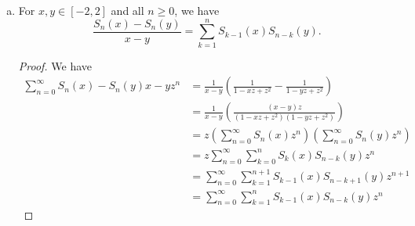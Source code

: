 \documentclass{article}
\begin{document}
\begin{enumerate}[(a)]
\begin{proof}
      Letting $x = 2 \cos(\theta)$, we have
      \begin{align*}
        \sum_{n=0}^\infty S_n(x) z^n & = \sum_{n=0}^\infty \frac{\sin((n+1) \theta)}{\sin{\theta}} z^n \\
        & =  \frac{1}{2i \sin(\theta)} \sum_{n=0}^\infty (e^{in\theta} - e^{-in\theta}) z^n \\
        & =  \frac{1}{2i \sin(\theta)} \sum_{n=0}^\infty (e^{i \theta}z)^n - (e^{-i \theta}z)^n \\
        & =  \frac{1}{2i \sin(\theta)} \left(\frac{1}{1 - (e^{i \theta}z)} - \frac{1}{1 -  (e^{-i \theta}z)} \right) \\
        & =  \frac{1}{2i \sin(\theta)} \left(\frac{2i\sin(\theta)}{1 -  2\cos(\theta)z + z^2} \right)\\
        & = \frac{1}{1 - xz + z^2}.
      \end{align*}
    \end{proof}

  \item For $x, y \in [-2,2]$ and all $n \ge 0$, we have
    $$\frac{S_n(x) - S_n(y)}{x - y} = \sum_{k = 1}^n S_{k-1}(x) S_{n-k}(y).$$
    
    \begin{proof}
      We have
      \begin{align*}
        \sum_{n = 0}^\infty {S_n(x) - S_n(y)}{x - y} z^n & = \frac{1}{x-y} \left( \frac{1}{1 - xz + z^2} - \frac{1}{1 - yz + z^2} \right) \\
        & = \frac{1}{x-y}\left(\frac{(x - y)z}{(1 - xz + z^2) (1 - yz + z^2)}\right) \\
        & = z \left( \sum_{n=0}^\infty S_n(x)z^n \right) \left(\sum_{n=0}^\infty S_n(y) z^n \right) \\
        & = z \sum_{n=0}^\infty \sum_{k = 0}^n S_k(x) S_{n-k}(y) z^n \\
        & = \sum_{n=0}^\infty \sum_{k = 1}^{n+1} S_{k-1}(x) S_{n-k+1}(y) z^{n+1} \\
        & = \sum_{n=0}^\infty \sum_{k = 1}^{n} S_{k-1}(x) S_{n-k}(y) z^{n}
      \end{align*}
    \end{proof}
  \end{enumerate}
\end{document}
